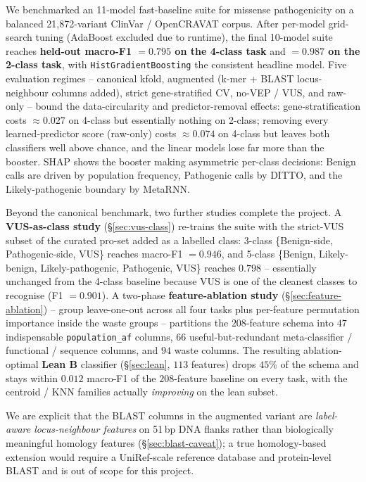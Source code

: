 \documentclass[11pt,a4paper]{article}
\begin{document}
We benchmarked an 11-model fast-baseline suite for missense pathogenicity on
a balanced 21{,}872-variant ClinVar / OpenCRAVAT corpus. After per-model
grid-search tuning (AdaBoost excluded due to runtime), the final 10-model
suite reaches \textbf{held-out macro-F1 $=0.795$ on the 4-class task} and
\textbf{$=0.987$ on the 2-class task}, with \texttt{HistGradientBoosting}
the consistent headline model. Five evaluation regimes -- canonical kfold,
augmented (k-mer + BLAST locus-neighbour columns added), strict
gene-stratified CV, no-VEP / VUS, and raw-only -- bound the data-circularity
and predictor-removal effects: gene-stratification costs $\approx 0.027$ on
4-class but essentially nothing on 2-class; removing every learned-predictor
score (raw-only) costs $\approx 0.074$ on 4-class but leaves both classifiers
well above chance, and the linear models lose far more than the booster.
SHAP shows the booster making asymmetric per-class decisions: Benign calls
are driven by population frequency, Pathogenic calls by DITTO, and the
Likely-pathogenic boundary by MetaRNN.

Beyond the canonical benchmark, two further studies complete the project.
A \textbf{VUS-as-class study} (\S\ref{sec:vus-class}) re-trains the suite
with the strict-VUS subset of the curated pro-set added as a labelled
class: 3-class \{Benign-side, Pathogenic-side, VUS\} reaches macro-F1
$=0.946$, and 5-class \{Benign, Likely-benign, Likely-pathogenic,
Pathogenic, VUS\} reaches $0.798$ -- essentially unchanged from the
4-class baseline because VUS is one of the cleanest classes to recognise
(F1 $=0.901$). A two-phase \textbf{feature-ablation study}
(\S\ref{sec:feature-ablation}) -- group leave-one-out across all four
tasks plus per-feature permutation importance inside the waste groups --
partitions the $208$-feature schema into $47$ indispensable
\texttt{population\_af} columns, $66$ useful-but-redundant
meta-classifier / functional / sequence columns, and $94$ waste columns.
The resulting ablation-optimal \textbf{Lean B} classifier
(\S\ref{sec:lean}, $113$ features) drops $45\%$ of the schema and stays
within $0.012$ macro-F1 of the $208$-feature baseline on every task,
with the centroid / KNN families actually \emph{improving} on the lean
subset.

We are explicit that the BLAST
columns in the augmented variant are \emph{label-aware locus-neighbour
features} on 51\,bp DNA flanks rather than biologically meaningful homology
features (\S\ref{sec:blast-caveat}); a true homology-based extension would
require a UniRef-scale reference database and protein-level BLAST and is
out of scope for this project.
\end{document}
